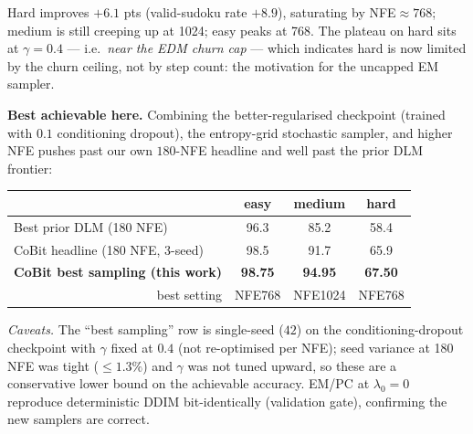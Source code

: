 \documentclass[10pt]{article}
\newcommand{\best}[1]{\textbf{\color{cobit}#1}}
\begin{document}
Hard improves $+6.1$ pts (valid-sudoku rate $+8.9$), saturating by NFE${\approx}768$; medium is
still creeping up at 1024; easy peaks at 768. The plateau on hard sits at $\gamma{=}0.4$ --- i.e.\
\emph{near the EDM churn cap} --- which indicates hard is now limited by the churn ceiling, not by
step count: the motivation for the uncapped EM sampler.

\textbf{Best achievable here.} Combining the better-regularised checkpoint (trained with $0.1$
conditioning dropout), the entropy-grid stochastic sampler, and higher NFE pushes past our own
$180$-NFE headline and well past the prior DLM frontier:

\begin{center}\small
\begin{tabular}{l c c c}
\toprule
 & \textbf{easy} & \textbf{medium} & \textbf{hard} \\
\midrule
Best prior DLM (180 NFE)              & 96.3 & 85.2 & 58.4 \\
CoBit headline (180 NFE, 3-seed)      & 98.5 & 91.7 & 65.9 \\
\best{CoBit best sampling (this work)} & \best{98.75} & \best{94.95} & \best{67.50} \\
\multicolumn{1}{r}{\footnotesize best setting} & {\footnotesize NFE768} & {\footnotesize NFE1024} & {\footnotesize NFE768} \\
\bottomrule
\end{tabular}
\end{center}

\footnotesize\emph{Caveats.} The ``best sampling'' row is single-seed ($42$) on the
conditioning-dropout checkpoint with $\gamma$ fixed at $0.4$ (not re-optimised per NFE); seed
variance at 180 NFE was tight ($\le1.3\%$) and $\gamma$ was not tuned upward, so these are a
conservative lower bound on the achievable accuracy. EM/PC at $\lambda_0{=}0$ reproduce
deterministic DDIM bit-identically (validation gate), confirming the new samplers are correct.
\end{document}
